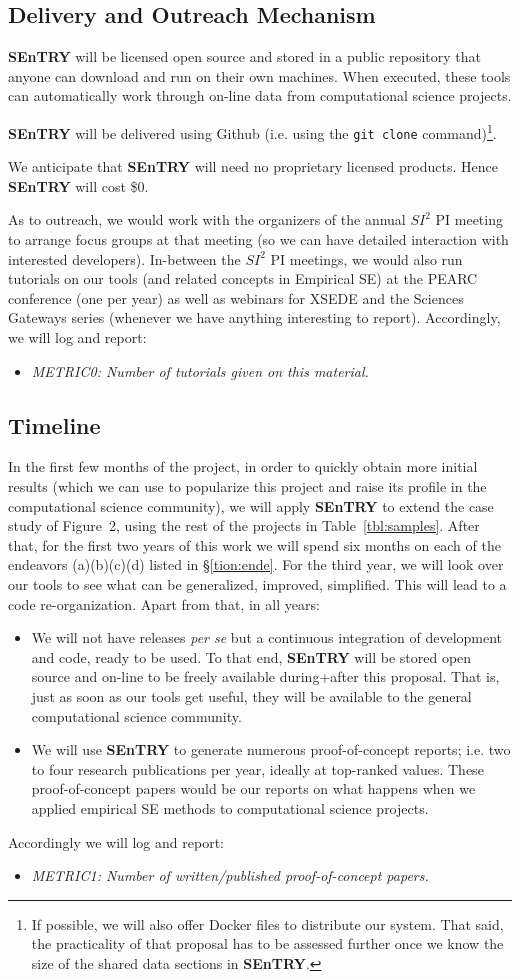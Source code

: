 \documentclass{NSF}
\newenvironment{myitemize}
{ \begin{itemize}
    \setlength{\itemsep}{0pt}
    \setlength{\parskip}{0pt}
    \setlength{\parsep}{0pt}     }
{ \end{itemize}                  }
\newcommand{\bi}{\begin{myitemize}}
\newcommand{\ei}{\end{myitemize}}
\newcommand{\tion}[1]{\S\ref{tion:#1}}
\newcommand{\tbl}[1]{Table~\ref{tbl:#1}}
\newcommand{\IT}{{\bf {\sffamily SEnTRY}}}
\begin{document}
\begin{nsfdescription}
\subsection{Delivery and Outreach Mechanism}\label{tion:outreach}  {\IT} will
be licensed
open source and
stored in a public
 repository
 that anyone can download and run on their own machines. When executed, these tools
can automatically  work through on-line data from computational science projects.  


{\IT}
will be delivered using Github (i.e. using the
{\tt git clone} command)\footnote{If possible, we will also offer Docker files to distribute our system.
That said, the practicality
of that proposal has to be assessed further once we know the size of the shared data sections
in {\IT}.}. 

We anticipate  that {\IT} will need no proprietary licensed products. Hence  {\IT}
will cost \$0.


As to outreach,
 we would work with the organizers of the annual $SI^2$ PI meeting to arrange focus groups at that meeting
 (so we can have detailed  interaction with interested developers).
In-between the $SI^2$ PI meetings, we would also 
run tutorials on our tools (and related concepts in Empirical SE)
at the PEARC conference (one per year)
as well as webinars
for XSEDE  
and the Sciences Gateways series (whenever we have anything interesting to report).
Accordingly, we will log and report:
\bi
\item {\em METRIC0: Number of tutorials given on this material.}
\ei

\subsection{Timeline}
In the first few months of the project, in order to quickly obtain more initial results (which we can use to popularize this project
and raise its profile in the computational science community), we will apply {\IT} to extend the case study of Figure~2, using the rest of the projects in \tbl{samples}.
After that, for the first two years of this work we will spend six months on each
of the endeavors (a)(b)(c)(d) listed in \tion{ende}. 
For the third year, we will look over our tools to see what can be generalized, improved, simplified. This will lead to a code re-organization.
Apart from that, in all years:
\bi
\item
We will not have releases {\em per se} but a continuous integration
of development and code, ready to be used.
To that end, {\IT}
will be stored open source and on-line to be freely available during+after
this proposal. That is,  just as soon as our tools get useful, they will be
available to the general computational science community.
\item
We will use {\IT} to generate numerous proof-of-concept reports;
i.e. two to four research publications per year, ideally
at top-ranked values.
These proof-of-concept papers would be our reports on what happens when we applied 
empirical SE methods to computational science projects. 
\ei
Accordingly we will log and report:
\bi
\item {\em METRIC1: Number of written/published proof-of-concept papers.}
\ei

\end{nsfdescription}
\end{document}
